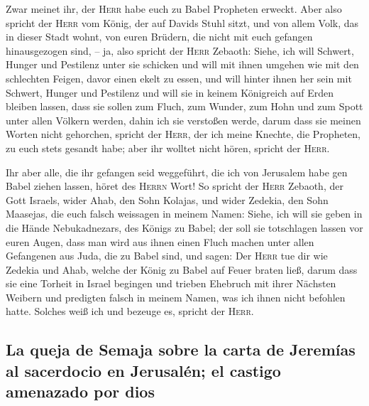  Zwar meinet ihr, der \textsc{Herr} habe euch zu Babel
Propheten erweckt.  Aber also spricht der \textsc{Herr}
vom König, der auf Davids Stuhl sitzt, und von allem Volk, das in dieser
Stadt wohnt, von euren Brüdern, die nicht mit euch gefangen
hinausgezogen sind,  -- ja, also spricht der
\textsc{Herr} Zebaoth: Siehe, ich will Schwert, Hunger und Pestilenz
unter sie schicken und will mit ihnen umgehen wie mit den schlechten
Feigen, davor einen ekelt zu essen,  und will hinter
ihnen her sein mit Schwert, Hunger und Pestilenz und will sie in keinem
Königreich auf Erden bleiben lassen, dass sie sollen zum Fluch, zum
Wunder, zum Hohn und zum Spott unter allen Völkern werden, dahin ich sie
verstoßen werde,  darum dass sie meinen Worten nicht
gehorchen, spricht der \textsc{Herr}, der ich meine Knechte, die
Propheten, zu euch stets gesandt habe; aber ihr wolltet nicht hören,
spricht der \textsc{Herr}.

 Ihr aber alle, die ihr gefangen seid weggeführt, die ich
von Jerusalem habe gen Babel ziehen lassen, höret des \textsc{Herrn}
Wort!  So spricht der \textsc{Herr} Zebaoth, der Gott
Israels, wider Ahab, den Sohn Kolajas, und wider Zedekia, den Sohn
Maasejas, die euch falsch weissagen in meinem Namen: Siehe, ich will sie
geben in die Hände Nebukadnezars, des Königs zu Babel; der soll sie
totschlagen lassen vor euren Augen,  dass man wird aus
ihnen einen Fluch machen unter allen Gefangenen aus Juda, die zu Babel
sind, und sagen: Der \textsc{Herr} tue dir wie Zedekia und Ahab, welche
der König zu Babel auf Feuer braten ließ,  darum dass sie
eine Torheit in Israel begingen und trieben Ehebruch mit ihrer Nächsten
Weibern und predigten falsch in meinem Namen, was ich ihnen nicht
befohlen hatte. Solches weiß ich und bezeuge es, spricht der
\textsc{Herr}.

\hypertarget{la-queja-de-semaja-sobre-la-carta-de-jeremuxedas-al-sacerdocio-en-jerusaluxe9n-el-castigo-amenazado-por-dios}{%
\subsection{La queja de Semaja sobre la carta de Jeremías al sacerdocio
en Jerusalén; el castigo amenazado por
dios}\label{la-queja-de-semaja-sobre-la-carta-de-jeremuxedas-al-sacerdocio-en-jerusaluxe9n-el-castigo-amenazado-por-dios}}

